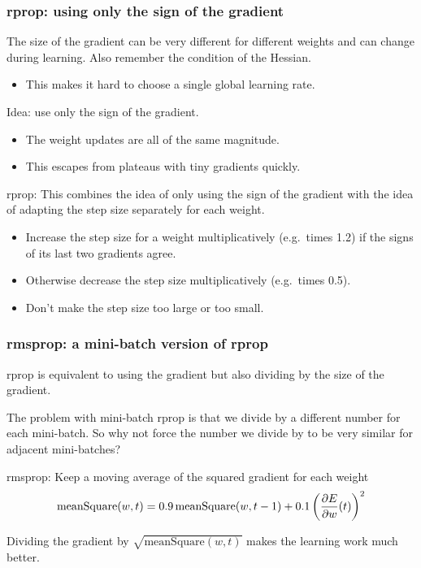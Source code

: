 \documentclass[USenglish,pdftex,compress,10pt,svgnamesi,handout]{beamer}
\begin{document}
\begin{frame}
\frametitle{rprop: using only the sign of the gradient}
The size of the gradient can be very different for different weights and can change during learning.  Also remember the condition of the Hessian.
\begin{itemize}
\item  This makes it hard to choose a single global learning rate.
\end{itemize}
Idea: use only the sign of the gradient.
\begin{itemize}
\item  The weight updates are all of the same magnitude.
\item This escapes from plateaus with tiny gradients quickly.
\end{itemize}
\pause
rprop: This combines the idea of only using the sign of the gradient with the idea of adapting the step size separately for each weight.
\begin{itemize}
\item  Increase the step size for a weight multiplicatively (e.g.\ times 1.2) if the signs of its last two gradients agree.
\item Otherwise decrease the step size multiplicatively (e.g.\ times 0.5).
\item Don't make the step size too large or too small.
\end{itemize}
\end{frame}



\begin{frame}
\frametitle{rmsprop: a mini-batch version of rprop}
rprop is equivalent to using the gradient but also dividing by the size of the gradient.

The problem with mini-batch rprop is that we divide by a different number for each mini-batch. So why not force the number we divide by to be very similar for adjacent mini-batches?

\pause
rmsprop: Keep a moving average of the squared gradient for each weight
$$
\mathrm{meanSquare}(w,t) = 0.9\, \mathrm{meanSquare}(w,t-1)
	+ 0.1 \left({\partial E \over \partial w} (t)\right)^2
$$

Dividing the gradient by $\sqrt{\mathrm{meanSquare}(w, t)}$ makes the learning work much better.
\end{frame}
\end{document}
